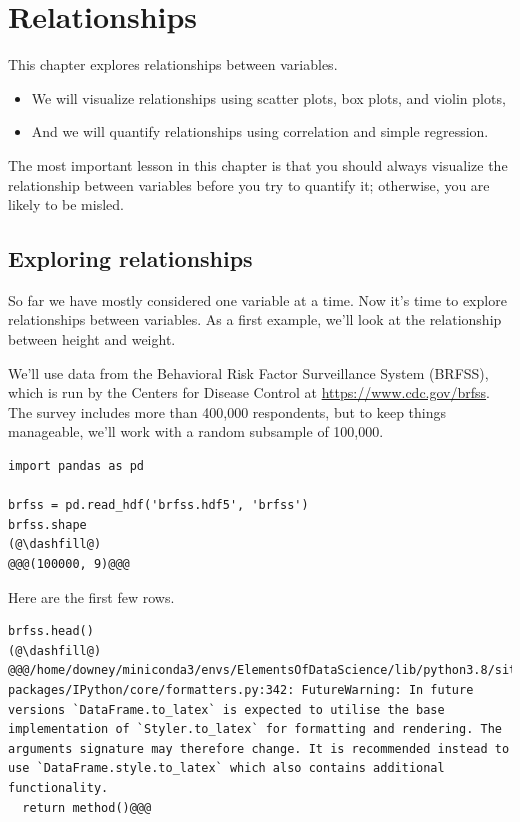 \hypertarget{relationships}{%
\chapter{Relationships}\label{relationships}}

This chapter explores relationships between variables.

\begin{itemize}
\item
  We will visualize relationships using scatter plots, box plots, and
  violin plots,
\item
  And we will quantify relationships using correlation and simple
  regression.
\end{itemize}

The most important lesson in this chapter is that you should always
visualize the relationship between variables before you try to quantify
it; otherwise, you are likely to be misled.

\hypertarget{exploring-relationships}{%
\section{Exploring relationships}\label{exploring-relationships}}

So far we have mostly considered one variable at a time. Now it's time
to explore relationships between variables. As a first example, we'll
look at the relationship between height and weight.

We'll use data from the Behavioral Risk Factor Surveillance System
(BRFSS), which is run by the Centers for Disease Control at
\url{https://www.cdc.gov/brfss}. The survey includes more than 400,000
respondents, but to keep things manageable, we'll work with a random
subsample of 100,000.

\begin{lstlisting}[]
import pandas as pd

brfss = pd.read_hdf('brfss.hdf5', 'brfss')
brfss.shape
(@\dashfill@)
@@@(100000, 9)@@@
\end{lstlisting}

Here are the first few rows.

\begin{lstlisting}[]
brfss.head()
(@\dashfill@)
@@@/home/downey/miniconda3/envs/ElementsOfDataScience/lib/python3.8/site-packages/IPython/core/formatters.py:342: FutureWarning: In future versions `DataFrame.to_latex` is expected to utilise the base implementation of `Styler.to_latex` for formatting and rendering. The arguments signature may therefore change. It is recommended instead to use `DataFrame.style.to_latex` which also contains additional functionality.
  return method()@@@
\end{lstlisting}

